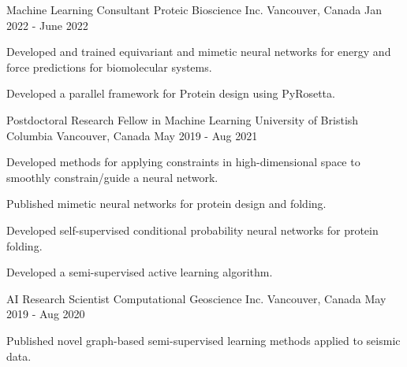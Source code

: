 

\begin{cventries}

  \cventry
    {Machine Learning Consultant} %
    {Proteic Bioscience Inc.} %
    {Vancouver, Canada} %
    {Jan 2022 - June 2022} %
    {
      \begin{cvitems} %
        \item {Developed and trained equivariant and mimetic neural networks for energy and force predictions for biomolecular systems.}
        \item {Developed a parallel framework for Protein design using PyRosetta.}
      \end{cvitems}
    }

  \cventry
    {Postdoctoral Research Fellow in Machine Learning} %
    {University of Bristish Columbia} %
    {Vancouver, Canada} %
    {May 2019 - Aug 2021} %
    {
      \begin{cvitems} %
        \item {Developed methods for applying constraints in high-dimensional space to smoothly constrain/guide a neural network.}
        \item {Published mimetic neural networks for protein design and folding.}
        \item {Developed self-supervised conditional probability neural networks for protein folding.}
        \item {Developed a semi-supervised active learning algorithm.}
      \end{cvitems}
    }

  \cventry
    {AI Research Scientist} %
    {Computational Geoscience Inc.} %
    {Vancouver, Canada} %
    {May 2019 - Aug 2020} %
    {
      \begin{cvitems} %
        \item {Published novel graph-based semi-supervised learning methods applied to seismic data.}
      \end{cvitems}
    }


\end{cventries}
